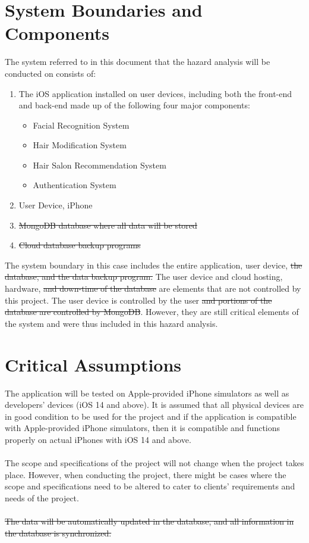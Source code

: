 \documentclass{article}
\begin{document}
\section{System Boundaries and Components}
The system referred to in this document that the hazard analysis will be conducted on consists of:
\begin{enumerate}
    \item The iOS application installed on user devices, including both the front-end and back-end made up of the following four major components:
    \begin{itemize}
        \item Facial Recognition System
        \item Hair Modification System
        \item Hair Salon Recommendation System
        \item Authentication System       
    \end{itemize}
    \item User Device, iPhone
    \item \sout{MongoDB database where all data will be stored}
    \item \sout{Cloud database backup programs}
\end{enumerate}

\noindent The system boundary in this case includes the entire application, user device, \sout{the database, and the data backup program.} The user device and cloud hosting, hardware, \sout{and down-time of the database} are elements that are not controlled by this project. The user device is controlled by the user \sout{and portions of the database are controlled by MongoDB}. However, they are still critical elements of the system and were thus included in this hazard analysis.

\section{Critical Assumptions}
The application will be tested on Apple-provided iPhone simulators as well as developers' devices (iOS 14 and above). It is assumed that all physical devices are in good condition to be used for the project and if the application is compatible with Apple-provided iPhone simulators, then it is compatible and functions properly on actual iPhones with iOS 14 and above.\\
\\
\noindent The scope and specifications of the project will not change when the project takes place. However, when conducting the project, there might be cases where the scope and specifications need to be altered to cater to clients' requirements and needs of the project.\\
\\
\noindent \sout{The data will be automatically updated in the database, and all information in the database is synchronized.}
\end{document}

